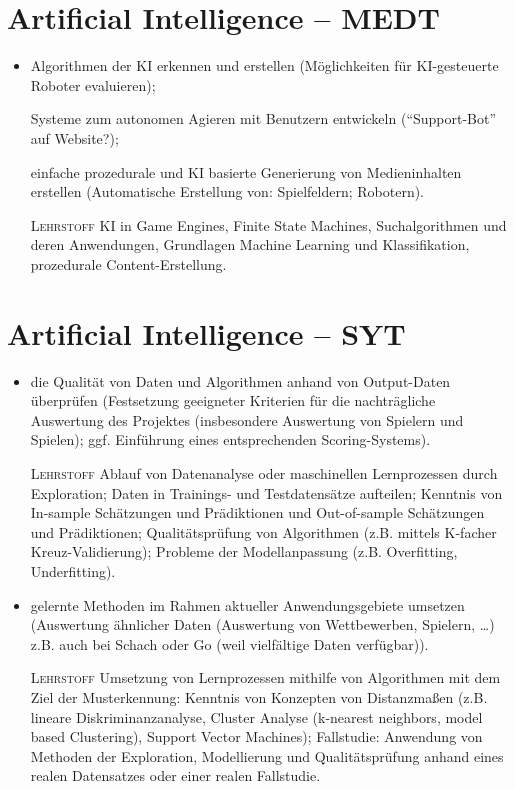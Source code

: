 \section{Artificial Intelligence -- MEDT}

\begin{itemize}[label={-}]
    \item Algorithmen der KI erkennen und erstellen
        {\color{red}(Möglichkeiten für KI-gesteuerte Roboter evaluieren)};
    \item[] Systeme zum autonomen Agieren mit Benutzern entwickeln
        {\color{red}(\enquote{Support-Bot} auf Website?)};
    \item[] einfache prozedurale und KI basierte Generierung von Medieninhalten erstellen
        {\color{red}(Automatische Erstellung von: Spielfeldern; Robotern)}.
    \item[\tiny\textsc{Lehrstoff}] KI in Game Engines, Finite State Machines, Suchalgorithmen und deren Anwendungen, Grundlagen Machine Learning und Klassifikation, prozedurale Content-Erstellung.
\end{itemize}


\section{Artificial Intelligence -- SYT}

\begin{itemize}[label={-}]
    \item die Qualität von Daten und Algorithmen anhand von Output-Daten überprüfen
        {\color{red}(Festsetzung geeigneter Kriterien für die nachträgliche Auswertung des Projektes (insbesondere Auswertung von Spielern und Spielen); ggf. Einführung eines entsprechenden Scoring-Systems)}.
    \item[\tiny\textsc{Lehrstoff}] Ablauf von Datenanalyse oder maschinellen Lernprozessen durch Exploration; Daten in Trainings- und Testdatensätze aufteilen; Kenntnis von In-sample Schätzungen und Prädiktionen und Out-of-sample Schätzungen und Prädiktionen; Qualitätsprüfung von Algorithmen (z.B. mittels K-facher Kreuz-Validierung); Probleme der Modellanpassung (z.B. Overfitting, Underfitting).\lehrstoffrule
 
    \item gelernte Methoden im Rahmen aktueller Anwendungsgebiete umsetzen
        {\color{red}(Auswertung ähnlicher Daten (Auswertung von Wettbewerben, Spielern, \dots) z.B. auch bei Schach oder Go (weil vielfältige Daten verfügbar))}.
    \item[\tiny\textsc{Lehrstoff}] Umsetzung von Lernprozessen mithilfe von Algorithmen mit dem Ziel der Musterkennung: Kenntnis von Konzepten von Distanzmaßen (z.B. lineare Diskriminanzanalyse, Cluster Analyse (k-nearest neighbors, model based Clustering), Support Vector Machines); Fallstudie: Anwendung von Methoden der Exploration, Modellierung und Qualitätsprüfung anhand eines realen Datensatzes oder einer realen Fallstudie.
\end{itemize}

